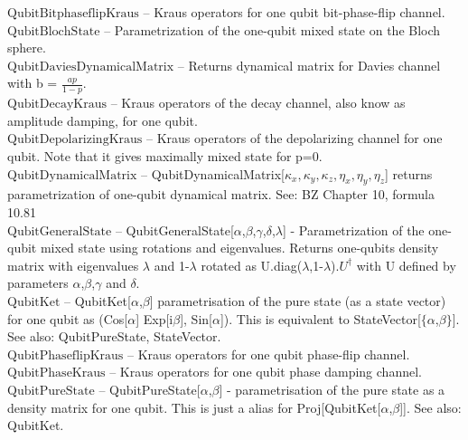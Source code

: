 \documentclass[a4paper,10pt]{scrartcl}
\begin{document}
\textbf{$ \text{QubitBitphaseflipKraus} $ }-- Kraus operators for one qubit bit-phase-flip channel.$  $\\

\textbf{$ \text{QubitBlochState} $ }-- Parametrization of the one-qubit mixed state on the Bloch sphere.$  $\\

\textbf{$ \text{QubitDaviesDynamicalMatrix} $ }-- Returns dynamical matrix for Davies channel with b = $ \frac{a p}{1-p}. $\\

\textbf{$ \text{QubitDecayKraus} $ }-- Kraus operators of the decay channel, also know as amplitude damping, for one qubit.$  $\\

\textbf{$ \text{QubitDepolarizingKraus} $ }-- Kraus operators of the depolarizing channel for one qubit. Note that it gives maximally mixed state for p=0.$  $\\

\textbf{$ \text{QubitDynamicalMatrix} $ }-- QubitDynamicalMatrix[$ \kappa _x,\kappa _y,\kappa _z,\eta _x,\eta _y,\eta _z $] returns parametrization of one-qubit dynamical matrix. See: BZ Chapter 10, formula 10.81$  $\\

\textbf{$ \text{QubitGeneralState} $ }-- QubitGeneralState[$\alpha $,$\beta $,$\gamma $,$\delta $,$\lambda $] - Parametrization of the one-qubit mixed state using rotations and eigenvalues. Returns one-qubits density matrix with eigenvalues $\lambda $ and 1-$\lambda $ rotated as U.diag($\lambda $,1-$\lambda $).$ U^{\dagger } $ with U defined by parameters $\alpha $,$\beta $,$\gamma $ and $\delta $.$  $\\

\textbf{$ \text{QubitKet} $ }-- QubitKet[$\alpha $,$\beta $] parametrisation of the pure state (as a state vector) for one qubit as (Cos[$\alpha $] Exp[i$\beta $], Sin[$\alpha $]). This is equivalent to StateVector[$\{\alpha $,$\beta \}$]. See also: QubitPureState, StateVector.$  $\\

\textbf{$ \text{QubitPhaseflipKraus} $ }-- Kraus operators for one qubit phase-flip channel.$  $\\

\textbf{$ \text{QubitPhaseKraus} $ }-- Kraus operators for one qubit phase damping channel.$  $\\

\textbf{$ \text{QubitPureState} $ }-- QubitPureState[$\alpha $,$\beta $] - parametrisation of the pure state as a density matrix for one qubit. This is just a alias for Proj[QubitKet[$\alpha $,$\beta $]]. See also: QubitKet.$  $\\
\end{document}
